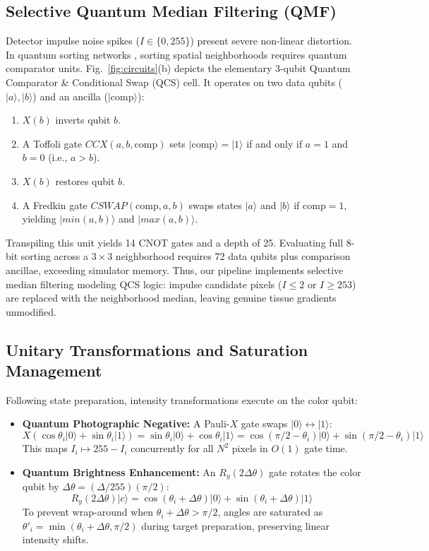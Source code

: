 \documentclass[12pt,onecolumn,draftclsnofoot]{IEEEtran}
\begin{document}
\subsection{Selective Quantum Median Filtering (QMF)}
Detector impulse noise spikes ($I \in \{0, 255\}$) present severe non-linear distortion. In quantum sorting networks \cite{wang2022quantum}, sorting spatial neighborhoods requires quantum comparator units. Fig.~\ref{fig:circuits}(b) depicts the elementary 3-qubit Quantum Comparator \& Conditional Swap (QCS) cell. It operates on two data qubits ($|a\rangle, |b\rangle$) and an ancilla ($|\text{comp}\rangle$):
\begin{enumerate}
    \item $X(b)$ inverts qubit $b$.
    \item A Toffoli gate $CCX(a, b, \text{comp})$ sets $|\text{comp}\rangle = |1\rangle$ if and only if $a=1$ and $b=0$ (i.e., $a > b$).
    \item $X(b)$ restores qubit $b$.
    \item A Fredkin gate $CSWAP(\text{comp}, a, b)$ swaps states $|a\rangle$ and $|b\rangle$ if $\text{comp}=1$, yielding $|min(a, b)\rangle$ and $|max(a, b)\rangle$.
\end{enumerate}
Transpiling this unit yields 14 CNOT gates and a depth of 25. Evaluating full 8-bit sorting across a $3\times3$ neighborhood requires 72 data qubits plus comparison ancillae, exceeding simulator memory. Thus, our pipeline implements selective median filtering modeling QCS logic: impulse candidate pixels ($I \le 2$ or $I \ge 253$) are replaced with the neighborhood median, leaving genuine tissue gradients unmodified.

\subsection{Unitary Transformations and Saturation Management}
Following state preparation, intensity transformations execute on the color qubit:
\begin{itemize}
    \item \textbf{Quantum Photographic Negative:} A Pauli-$X$ gate swaps $|0\rangle \leftrightarrow |1\rangle$:
    \begin{equation}
    X (\cos\theta_i |0\rangle + \sin\theta_i |1\rangle) = \sin\theta_i |0\rangle + \cos\theta_i |1\rangle = \cos(\pi/2 - \theta_i) |0\rangle + \sin(\pi/2 - \theta_i) |1\rangle
    \end{equation}
    This maps $I_i \mapsto 255 - I_i$ concurrently for all $N^2$ pixels in $O(1)$ gate time.
    \item \textbf{Quantum Brightness Enhancement:} An $R_y(2\Delta\theta)$ gate rotates the color qubit by $\Delta\theta = (\Delta / 255)(\pi / 2)$:
    \begin{equation}
    R_y(2\Delta\theta) |c\rangle = \cos(\theta_i + \Delta\theta) |0\rangle + \sin(\theta_i + \Delta\theta) |1\rangle
    \end{equation}
    To prevent wrap-around when $\theta_i + \Delta\theta > \pi/2$, angles are saturated as $\theta'_i = \min(\theta_i + \Delta\theta, \pi/2)$ during target preparation, preserving linear intensity shifts.
\end{itemize}
\end{document}
